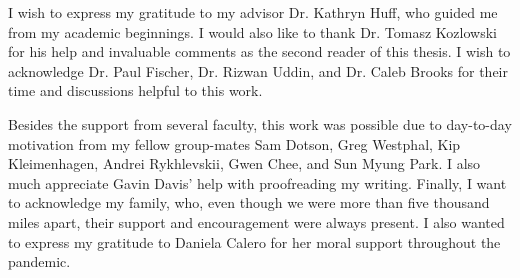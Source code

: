 
I wish to express my gratitude to my advisor Dr. Kathryn Huff, who guided me from my academic beginnings.
I would also like to thank Dr. Tomasz Kozlowski for his help and invaluable comments as the second reader of this thesis.
I wish to acknowledge Dr. Paul Fischer, Dr. Rizwan Uddin, and Dr. Caleb Brooks for their time and discussions helpful to this work.

Besides the support from several faculty, this work was possible due to day-to-day motivation from my fellow group-mates Sam Dotson, Greg Westphal, Kip Kleimenhagen, Andrei Rykhlevskii, Gwen Chee, and Sun Myung Park.
I also much appreciate Gavin Davis' help with proofreading my writing.
Finally, I want to acknowledge my family, who, even though we were more than five thousand miles apart, their support and encouragement were always present.
I also wanted to express my gratitude to Daniela Calero for her moral support throughout the pandemic.
